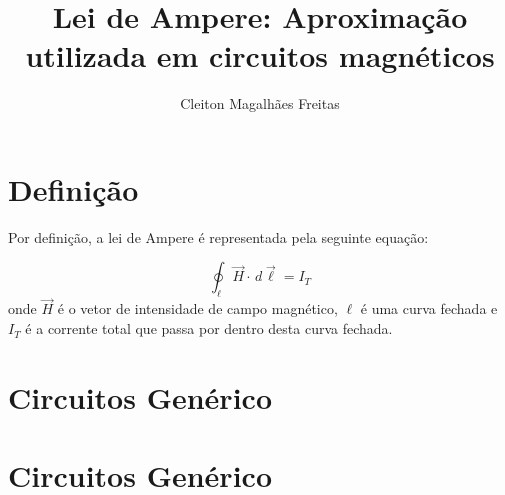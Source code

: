 \documentclass[12pt,a4paper]{article}
\author{Cleiton Magalhães Freitas}
\date{}
\title{Lei de Ampere: Aproximação utilizada em circuitos magnéticos}
\begin{document}
\maketitle



\section*{Definição}

Por definição, a lei de Ampere é representada pela seguinte equação:

\begin{equation}
\displaystyle
\oint_\ell \vec{H} \cdot \,d\vec{\ell} = I_{T}
\end{equation}
%
onde $\vec{H}$ é o vetor de intensidade de campo magnético, $\ell$ é uma curva fechada e $I_T$ é a corrente total que passa por dentro desta curva fechada. 



\section*{Circuitos Genérico}



\section*{Circuitos Genérico}



\cite{hayt2013eletromagnetismo}




\end{document}
